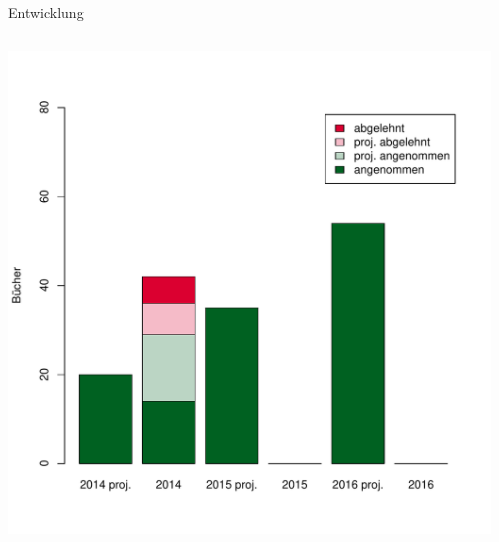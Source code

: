\documentclass[final]{beamer}
\begin{document}
\begin{frame}{}
\begin{columns}[t]
\begin{column}{.45\linewidth}
\begin{block}{Entwicklung}
\begin{columns}
\begin{column}{.26\textwidth}
	  \includegraphics[width=\textwidth]{buecher.pdf}

      
	\end{column}
      \end{columns}
    \end{block}


   
  \end{column}
  \begin{column}{.45\linewidth}
 

\end{column}
\end{columns}
\end{frame}
\end{document}

